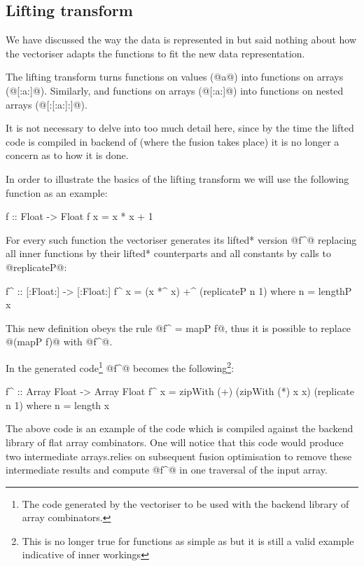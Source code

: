 \documentclass[preamble.tex]{subfiles}
\begin{document}
\subsection{Lifting transform}
\label{sec:Lifting}

We have discussed the way the data is represented in \DPH but said nothing about how the vectoriser adapts the functions to fit the new data representation.

The lifting transform turns functions on values (@a@) into functions on arrays (@[:a:]@). Similarly, and functions on arrays (@[:a:]@) into functions on nested arrays (@[:[:a:]:]@).

It is not necessary to delve into too much detail here, since by the time the lifted code is compiled in backend of \DPH (where the fusion takes place) it is no longer a concern as to how it is done.

In order to illustrate the basics of the lifting transform we will use the following function as an example:

\begin{hscode}
f :: Float -> Float
f x = x * x + 1
\end{hscode}

For every such function the vectoriser generates its \*lifted* version @f^@ replacing all inner functions by their \*lifted* counterparts and all constants by calls to @replicateP@:

\begin{hscode}[literate={^}{{$^\uparrow$}}1]
f^ :: [:Float:] -> [:Float:]
f^ x = (x *^ x) +^ (replicateP n 1)
  where n = lengthP x
\end{hscode}

This new definition obeys the rule @f^ = mapP f@, thus it is possible to replace @(mapP f)@ with @f^@.

In the generated code\footnote{The code generated by the vectoriser to be used with the backend library of array combinators.} @f^@ becomes the following\footnote{This is no longer true for functions as simple as  \cite{vectavoid} but it is still a valid example indicative of \DPH inner workings }:

\begin{hscode}[literate={^}{{$^\uparrow$}}1]
f^ :: Array Float -> Array Float
f^ x = zipWith (+) (zipWith (*) x x)
                   (replicate n 1)
  where n = length x
\end{hscode}

The above code is an example of the code which is compiled against the backend library of flat array combinators. One will notice that this code would produce two intermediate arrays.\iintermediate \DPH relies on subsequent fusion optimisation to remove these intermediate results and compute @f^@ in one traversal of the input array.
\end{document}
